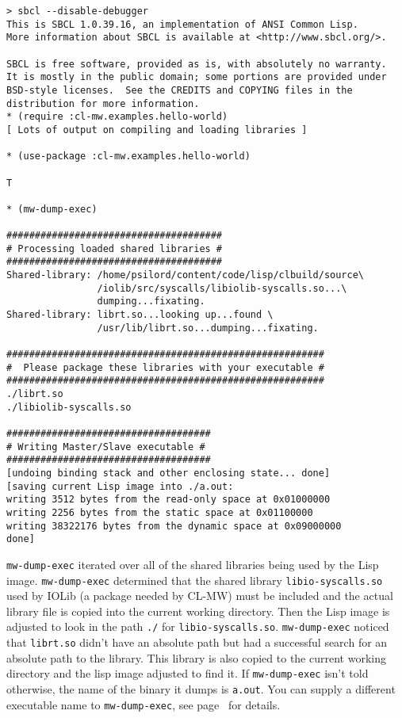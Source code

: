 \documentclass[titlepage,12pt]{book}
\newcommand{\xsmall}{\latexhtml{\small}{}}
\newcommand{\xnormalsize}{\latexhtml{\normalsize}{}}
\newcommand{\clmw}{\xsmall\textsc{CL-MW}\xnormalsize\xspace}
\newcommand{\func}[1]{\mbox{\texttt{#1}}\xspace}
\newcommand{\file}[1]{\texttt{#1}\xspace}
\begin{document}
\small
\begin{verbatim}
> sbcl --disable-debugger
This is SBCL 1.0.39.16, an implementation of ANSI Common Lisp.
More information about SBCL is available at <http://www.sbcl.org/>.

SBCL is free software, provided as is, with absolutely no warranty.
It is mostly in the public domain; some portions are provided under
BSD-style licenses.  See the CREDITS and COPYING files in the
distribution for more information.
* (require :cl-mw.examples.hello-world)
[ Lots of output on compiling and loading libraries ]

* (use-package :cl-mw.examples.hello-world)

T

* (mw-dump-exec)

######################################
# Processing loaded shared libraries #
######################################
Shared-library: /home/psilord/content/code/lisp/clbuild/source\
                /iolib/src/syscalls/libiolib-syscalls.so...\
                dumping...fixating.
Shared-library: librt.so...looking up...found \
                /usr/lib/librt.so...dumping...fixating.

########################################################
#  Please package these libraries with your executable #
########################################################
./librt.so
./libiolib-syscalls.so

####################################
# Writing Master/Slave executable #
####################################
[undoing binding stack and other enclosing state... done]
[saving current Lisp image into ./a.out:
writing 3512 bytes from the read-only space at 0x01000000
writing 2256 bytes from the static space at 0x01100000
writing 38322176 bytes from the dynamic space at 0x09000000
done]
\end{verbatim}
\normalsize

\func{mw-dump-exec} iterated over all of the shared libraries being
used by the Lisp image. \func{mw-dump-exec} determined that the shared
library \file{libio-syscalls.so} used by IOLib (a package needed by
\clmw) must be included and the actual library file is copied into the
current working directory. Then the Lisp image is adjusted to look in
the path \file{./} for \file{libio-syscalls.so}.  \func{mw-dump-exec}
noticed that \file{librt.so} didn't have an absolute path but had a
successful search for an absolute path to the library.  This library
is also copied to the current working directory and the lisp image
adjusted to find it. If \func{mw-dump-exec} isn't told otherwise, the
name of the binary it dumps is \file{a.out}. You can supply a different
executable name to \func{mw-dump-exec}, see page~\pageref{mw-dump-exec}
for details.
\end{document}
